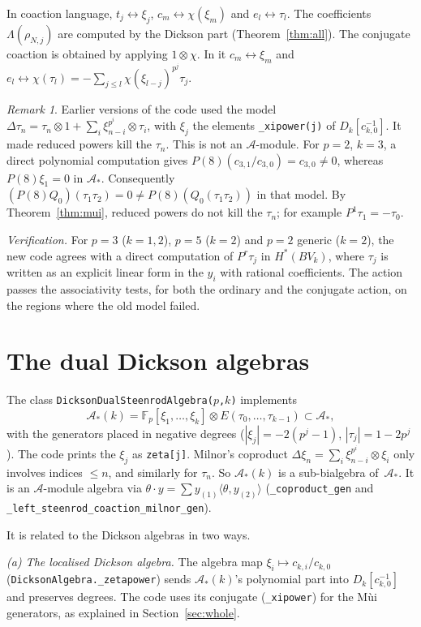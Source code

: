 \documentclass[11pt]{amsart}
\theoremstyle{definition}
\theoremstyle{remark}
\newtheorem{remark}[theorem]{Remark}
\newcommand{\F}{\mathbb{F}_p}
\newcommand{\A}{\mathcal{A}}
\newcommand{\Dk}{D_k}
\newcommand{\code}[1]{\texttt{#1}}
\begin{document}
In coaction language, $t_j\leftrightarrow\xi_j$, $c_m\leftrightarrow\chi(\xi_m)$
and $e_l\leftrightarrow\tau_l$.  The coefficients $\Lambda(\rho_{N,j})$ are
computed by the Dickson part (Theorem~\ref{thm:all}).  The conjugate coaction is
obtained by applying $1\otimes\chi$.  In it $c_m\leftrightarrow\xi_m$ and
$e_l\leftrightarrow\chi(\tau_l)=-\sum_{j\le l}\chi(\xi_{l-j})^{p^j}\tau_j$.

\begin{remark}
Earlier versions of the code used the model
$\Delta\tau_n=\tau_n\otimes1+\sum_i\xi_{n-i}^{p^i}\otimes\tau_i$, with $\xi_j$ the
elements \code{\_xipower(j)} of $\Dk[c_{k,0}^{-1}]$.  It made reduced powers
kill the $\tau_n$.  This is not an $\A$-module.  For $p=2$, $k=3$, a direct
polynomial computation gives $P(8)(c_{3,1}/c_{3,0})=c_{3,0}\ne0$, whereas
$P(8)\xi_1=0$ in $\A_*$.  Consequently
$(P(8)Q_0)(\tau_1\tau_2)=0\ne P(8)(Q_0(\tau_1\tau_2))$ in that model.  By
Theorem~\ref{thm:mui}, reduced powers do not kill the $\tau_n$; for example
$P^1\tau_1=-\tau_0$.
\end{remark}

\emph{Verification.}  For $p=3$ ($k=1,2$), $p=5$ ($k=2$) and $p=2$ generic
($k=2$), the new code agrees with a direct computation of $P^r\tau_j$ in
$H^*(BV_k)$, where $\tau_j$ is written as an explicit linear form in the $y_i$
with rational coefficients.  The action passes the associativity tests, for
both the ordinary and the conjugate action, on the regions where the old model
failed.

\section{The dual Dickson algebras}\label{sec:dual}

The class \code{DicksonDualSteenrodAlgebra($p$,$k$)} implements
\[
  \A_*(k)=\F[\xi_1,\dots,\xi_k]\otimes E(\tau_0,\dots,\tau_{k-1})\subset\A_* ,
\]
with the generators placed in negative degrees ($|\xi_j|=-2(p^j-1)$,
$|\tau_j|=1-2p^j$).  The code prints the $\xi_j$ as \code{zeta[j]}.  Milnor's
coproduct $\Delta\xi_n=\sum_i\xi_{n-i}^{p^i}\otimes\xi_i$ only involves
indices $\le n$, and similarly for $\tau_n$.  So $\A_*(k)$ is a sub-bialgebra
of~$\A_*$.  It is an $\A$-module algebra via
$\theta\cdot y=\sum y_{(1)}\langle\theta,y_{(2)}\rangle$
(\code{\_coproduct\_gen} and \code{\_left\_steenrod\_coaction\_milnor\_gen}).

It is related to the Dickson algebras in two ways.

\emph{(a) The localised Dickson algebra.}  The algebra map
$\xi_i\mapsto c_{k,i}/c_{k,0}$ (\code{DicksonAlgebra.\_zetapower}) sends
$\A_*(k)$'s polynomial part into $\Dk[c_{k,0}^{-1}]$ and preserves degrees.
The code uses its conjugate (\code{\_xipower}) for the M\`ui generators, as
explained in Section~\ref{sec:whole}.
\end{document}
